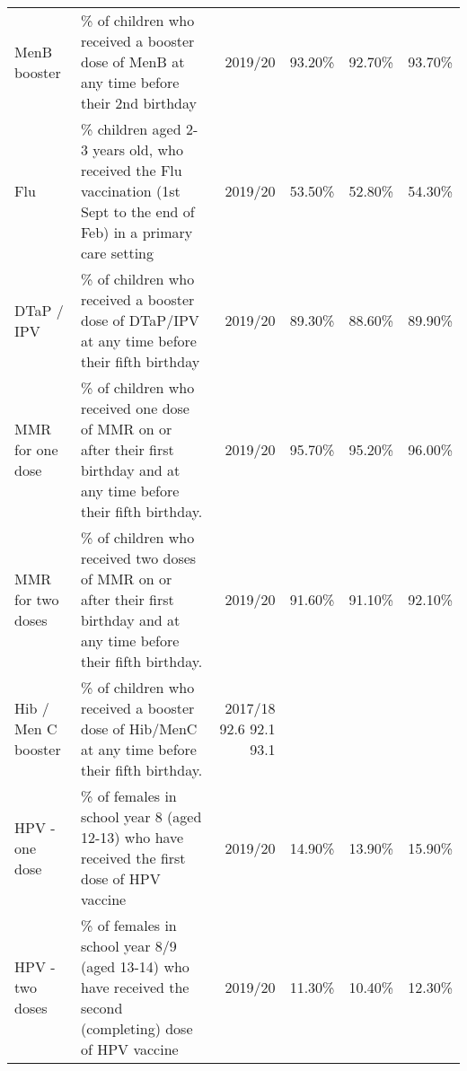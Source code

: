 \begin{table*}[hbt]
\begin{tabular}{llrrrr}
    MenB booster & \% of children who received a booster dose of MenB at any time before their 2nd birthday & 2019/20 & 93.20\% & 92.70\% & 93.70\% \\
    Flu & \% children aged 2-3 years old, who received the Flu vaccination (1st Sept to the end of Feb) in a primary care setting & 2019/20 & 53.50\% & 52.80\% & 54.30\% \\
    DTaP / IPV & \% of children who received a booster dose of DTaP/IPV at any time before their fifth birthday & 2019/20 & 89.30\% & 88.60\% & 89.90\% \\
    MMR for one dose & \% of children who received one dose of MMR on or after their first birthday and at any time before their fifth birthday. & 2019/20 & 95.70\% & 95.20\% & 96.00\% \\
    MMR for two doses & \% of children who received two doses of MMR on or after their first birthday and at any time before their fifth birthday. &  2019/20 & 91.60\% & 91.10\% & 92.10\% \\
    Hib / Men C booster & \% of children who received a booster dose of Hib/MenC at any time before their fifth birthday. & 2017/18 92.6 92.1 93.1 \\
    HPV - one dose & \% of females in school year 8 (aged 12-13) who have received the first dose of HPV vaccine & 2019/20 & 14.90\% & 13.90\% & 15.90\% \\
    HPV - two doses & \% of females in school year 8/9 (aged 13-14) who have received the second (completing) dose of HPV vaccine & 2019/20 & 11.30\% &10.40\% & 12.30\% \\
    \bottomrule
\end{tabular}
\label{tab:childhoodimms}
\end{table*}